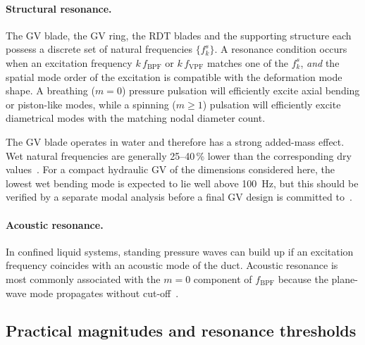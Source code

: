 \paragraph{Structural resonance.} The \ac{GV} blade, the \ac{GV}
ring, the \ac{RDT} blades and the supporting structure each possess
a discrete set of natural frequencies $\{f_k^s\}$. A resonance
condition occurs when an excitation frequency $k\,f_{\mathrm{BPF}}$
or $k\,f_{\mathrm{VPF}}$ matches one of the $f_k^s$, \emph{and} the
spatial mode order of the excitation is compatible with the
deformation mode shape. A breathing ($m=0$) pressure pulsation will
efficiently excite axial bending or piston-like modes, while a
spinning ($m\geq 1$) pulsation will efficiently excite diametrical
modes with the matching nodal diameter count.

The \ac{GV} blade operates in water and therefore has a strong
added-mass effect. Wet natural frequencies are generally 25--40\,\%
lower than the corresponding dry values~\cite{tanaka2011}. For a
compact hydraulic \ac{GV} of the dimensions considered here, the
lowest wet bending mode is expected to lie well above 100~Hz, but
this should be verified by a separate modal analysis before a final
\ac{GV} design is committed to~\cite{valentin2015}.

\paragraph{Acoustic resonance.} In confined liquid systems, standing
pressure waves can build up if an excitation frequency coincides with
an acoustic mode of the duct. Acoustic resonance is most commonly
associated with the $m=0$ component of $f_{\mathrm{BPF}}$ because
the plane-wave mode propagates without cut-off~\cite{nicolet2007}.

\subsection{Practical magnitudes and resonance thresholds}
\label{sec:rsi-magnitudes}

